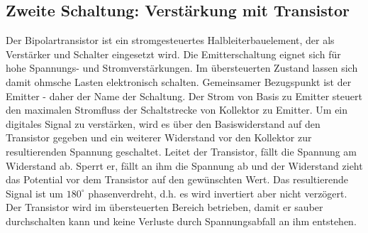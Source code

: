 \subsection{Zweite Schaltung: Verstärkung mit Transistor} \label{schaltung:transistor}
Der Bipolartransistor ist ein stromgesteuertes Halbleiterbauelement, der als Verstärker und Schalter eingesetzt wird. Die Emitterschaltung eignet sich für hohe Spannungs- und Stromverstärkungen. Im übersteuerten Zustand lassen sich damit ohmsche Lasten elektronisch schalten. Gemeinsamer Bezugspunkt ist der Emitter - daher der Name der Schaltung. Der Strom von Basis zu Emitter steuert den maximalen Stromfluss der Schaltstrecke von Kollektor zu Emitter. Um ein digitales Signal zu verstärken, wird es über den Basiswiderstand auf den Transistor gegeben und ein weiterer Widerstand vor den Kollektor zur resultierenden Spannung geschaltet. Leitet der Transistor, fällt die Spannung am Widerstand ab. Sperrt er, fällt an ihm die Spannung ab und der Widerstand zieht das Potential vor dem Transistor auf den gewünschten Wert. Das resultierende Signal ist um $180^\circ$ phasenverdreht, d.h. es wird invertiert aber nicht verzögert. Der Transistor wird im übersteuerten Bereich betrieben, damit er sauber durchschalten kann und keine Verluste durch Spannungsabfall an ihm entstehen. \\


